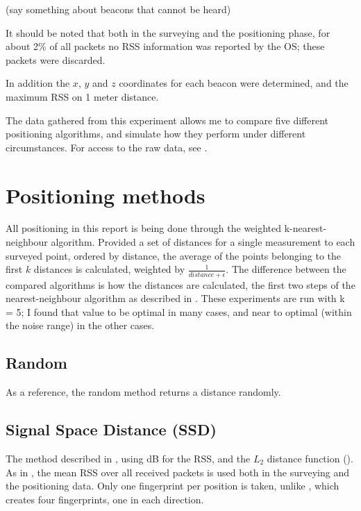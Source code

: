 (say something about beacons that cannot be heard)

It should be noted that both in the surveying and the positioning phase, for about 2\% of all packets no RSS information was reported by the OS; these packets were discarded.

In addition the $x$, $y$ and $z$ coordinates for each beacon were determined, and the maximum RSS on 1 meter distance.

The data gathered from this experiment allows me to compare five different positioning algorithms, and simulate how they perform under different circumstances.
For access to the raw data, see .

\section{Positioning methods}

All positioning in this report is being done through the weighted k-nearest-neighbour algorithm.
Provided a set of distances for a single measurement to each surveyed point, ordered by distance, the average of the points belonging to the first $k$ distances is calculated, weighted by $\frac{1}{distance+\epsilon}$.
The difference between the compared algorithms is how the distances are calculated, the first two steps of the nearest-neighbour algorithm as described in .
These experiments are run with k = 5; I found that value to be optimal in many cases, and near to optimal (within the noise range) in the other cases.

\subsection{Random}
As a reference, the random method returns a distance randomly.

\subsection{Signal Space Distance (SSD)}
The method described in \citet{bahl2000radar}, using dB for the RSS, and the $L_2$ distance function ().
As in \citet{bahl2000radar}, the mean RSS over all received packets is used both in the surveying and the positioning data.
Only one fingerprint per position is taken, unlike \citet{bahl2000radar}, which creates four fingerprints, one in each direction.

